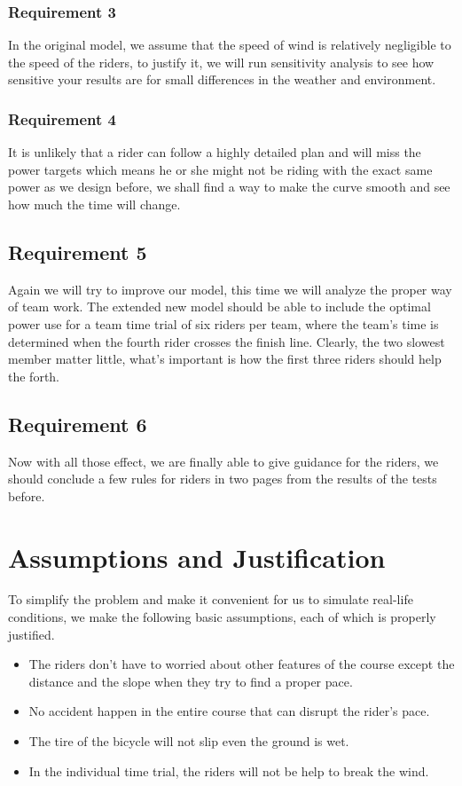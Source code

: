 \documentclass[12pt]{article}
\begin{document}
\subsubsection{Requirement 3}
In the original model, we assume that the speed of wind is relatively negligible %
to the speed of the riders, to justify it, we will run sensitivity analysis to see how sensitive your results are for small differences in the weather
and environment.
\subsubsection{Requirement 4}
It is unlikely that a rider can follow a highly detailed plan and will miss the power targets which means he or she might not be riding with the exact same power as
we design before, we shall find a way to make the curve smooth and see how much the time will change. %
\subsection{Requirement 5}
Again we will try to improve our model, this time we will analyze the proper way of team work. The extended new model should be able to  include the optimal power use for a team time trial of six riders per team, where the team's time is
determined when the fourth rider crosses the finish line. Clearly, the two slowest member matter little, what's important is how the first three riders should help the forth.
\subsection{Requirement 6}
Now with all those effect, we are finally able to give guidance for the riders, we should conclude  a few rules for riders in two pages from the results of the tests before.
\section{Assumptions and Justification}

To simplify the problem and make it convenient for us to simulate real-life conditions, we make the following basic assumptions, each of which is properly justified.

\begin{itemize}
    \item The riders don't have to worried about other features of the course except the distance and the slope when they try to find a proper pace.
    \item No accident happen in the entire course that can disrupt the rider's pace.
    \item The tire of the bicycle will not slip even the ground is wet.
    \item In the individual time trial, the riders will not be help to break the wind.

\end{itemize}
\end{document}
